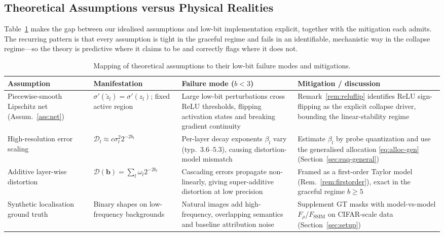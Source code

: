 \subsection{Theoretical Assumptions versus Physical Realities}
\label{sec:assumptions}
Table~\ref{tab:assumptions} makes the gap between our idealised assumptions and
low-bit implementation explicit, together with the mitigation each admits. The
recurring pattern is that every assumption is tight in the graceful regime and
fails in an identifiable, mechanistic way in the collapse regime---so the theory
is predictive where it claims to be and correctly flags where it does not.

\begin{table}[!t]
\caption{Mapping of theoretical assumptions to their low-bit failure modes and
mitigations.}
\label{tab:assumptions}
\centering
\begin{tabular}{p{3.1cm} p{3.6cm} p{4.0cm} p{4.4cm}}
\hline
\textbf{Assumption} & \textbf{Manifestation} & \textbf{Failure mode ($b<3$)} &
\textbf{Mitigation / discussion}\\
\hline
Piecewise-smooth Lipschitz net (Assum.~\ref{ass:net}) &
$\sigma'(\tilde z_l)=\sigma'(z_l)$; fixed active region &
Large low-bit perturbations cross ReLU thresholds, flipping activation states and
breaking gradient continuity &
Remark~\ref{rem:reluflip} identifies ReLU sign-flipping as the explicit collapse
driver, bounding the linear-stability regime\\
High-resolution error scaling & $\mathcal D_l\!\approx\!c\sigma_l^2 2^{-2b_l}$ &
Per-layer decay exponents $\beta_l$ vary (typ.\ $3.6$--$5.3$), causing
distortion-model mismatch &
Estimate $\beta_l$ by probe quantization and use the generalised allocation
\eqref{eq:alloc-gen} (Section~\ref{sec:eaq-general})\\
Additive layer-wise distortion & $\mathcal D(\bm b)=\sum_l\omega_l2^{-2b_l}$ &
Cascading errors propagate non-linearly, giving super-additive distortion at low
precision &
Framed as a first-order Taylor model (Rem.~\ref{rem:firstorder}), exact in the
graceful regime $b\ge5$\\
Synthetic localisation ground truth & Binary shapes on low-frequency backgrounds
& Natural images add high-frequency, overlapping semantics and baseline
attribution noise &
Supplement GT masks with model-vs-model $F_\rho$/$F_{\mathrm{SSIM}}$ on
CIFAR-scale data (Section~\ref{sec:setup})\\
\hline
\end{tabular}
\end{table}

